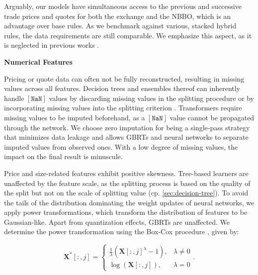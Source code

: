 Arguably, our models have simultaneous access to the previous and successive trade prices and quotes for both the exchange and the \gls{NBBO}, which is an advantage over base rules. As we benchmark against various, stacked hybrid rules, the data requirements are still comparable. We emphasize this aspect, as it is neglected in previous works \autocites[\checkmark][485]{blazejewskiLocalNonParametricModel2005}[\checkmark][48]{ronenMachineLearningTrade2022}[\checkmark][398]{rosenthalModelingTradeDirection2012}.

\textbf{Numerical Features}

Pricing or quote data can often not be fully reconstructed, resulting in missing values across all features. Decision trees and ensembles thereof can inherently handle $\mathtt{[NaN]}$ values by discarding missing values in the splitting procedure \autocite[\checkmark][150--152]{breimanClassificationRegressionTrees2017} or by incorporating missing values into the splitting criterion \autocite[\checkmark][951]{twalaGoodMethodsCoping2008}. Transformers require missing values to be imputed beforehand, as a $\mathtt{[NaN]}$ value cannot be propagated through the network. We choose zero imputation for being a single-pass strategy that minimizes data leakage and allows \glspl{GBRT} and neural networks to separate imputed values from observed ones. With a low degree of missing values, the impact on the final result is minuscule.

Price and size-related features exhibit positive skewness. Tree-based learners are unaffected by the feature scale, as the splitting process is based on the quality of the split but not on the scale of splitting value (cp. \cref{sec:decision-tree}). To avoid the tails of the distribution dominating the weight updates of neural networks, we apply power transformations, which transform the distribution of features to be Gaussian-like. Apart from quantization effects, \glspl{GBRT} are unaffected. We determine the power transformation using the Box-Cox procedure \autocite[\checkmark][214]{boxAnalysisTransformations2022}, given by:

\begin{equation}
    \mathbf{X}^{*}\left[:,j\right]= \begin{cases}\frac{1}{\lambda}(\mathbf{X}\left[:,j\right]^\lambda-1), & \lambda \neq 0 \\ \log (\mathbf{X}\left[:,j\right]),& \lambda=0\end{cases}.
    \label{eq:box-cox-test}
\end{equation}

